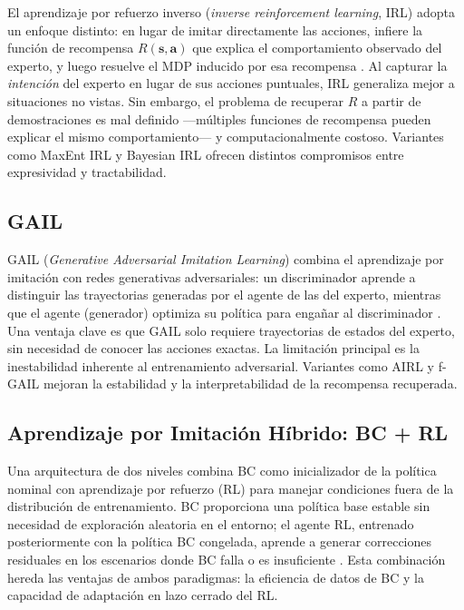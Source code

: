 El aprendizaje por refuerzo inverso (\textit{inverse reinforcement learning}, IRL) adopta un enfoque distinto: en lugar de imitar directamente las acciones, infiere la función de recompensa $R(\mathbf{s}, \mathbf{a})$ que explica el comportamiento observado del experto, y luego resuelve el MDP inducido por esa recompensa \cite{kumar2021}. Al capturar la \textit{intención} del experto en lugar de sus acciones puntuales, IRL generaliza mejor a situaciones no vistas. Sin embargo, el problema de recuperar $R$ a partir de demostraciones es mal definido —múltiples funciones de recompensa pueden explicar el mismo comportamiento— y computacionalmente costoso. Variantes como MaxEnt IRL y Bayesian IRL ofrecen distintos compromisos entre expresividad y tractabilidad.

\subsection{GAIL}

GAIL (\textit{Generative Adversarial Imitation Learning}) combina el aprendizaje por imitación con redes generativas adversariales: un discriminador aprende a distinguir las trayectorias generadas por el agente de las del experto, mientras que el agente (generador) optimiza su política para engañar al discriminador \cite{kumar2021}. Una ventaja clave es que GAIL solo requiere trayectorias de estados del experto, sin necesidad de conocer las acciones exactas. La limitación principal es la inestabilidad inherente al entrenamiento adversarial. Variantes como AIRL y f-GAIL mejoran la estabilidad y la interpretabilidad de la recompensa recuperada.

\subsection{Aprendizaje por Imitación Híbrido: BC + RL}

Una arquitectura de dos niveles combina BC como inicializador de la política nominal con aprendizaje por refuerzo (RL) para manejar condiciones fuera de la distribución de entrenamiento. BC proporciona una política base estable sin necesidad de exploración aleatoria en el entorno; el agente RL, entrenado posteriormente con la política BC congelada, aprende a generar correcciones residuales en los escenarios donde BC falla o es insuficiente \cite{kumar2021, zhang2023}. Esta combinación hereda las ventajas de ambos paradigmas: la eficiencia de datos de BC y la capacidad de adaptación en lazo cerrado del RL.

